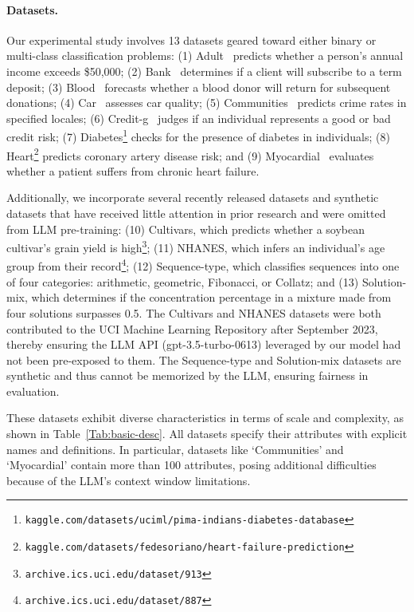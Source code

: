 \paragraph{Datasets.}
Our experimental study involves 13 datasets geared toward either binary or multi-class classification problems: (1) Adult~\cite{asuncion2007uci} predicts whether a person's annual income exceeds \$50,000; (2) Bank~\cite{moro2014data} determines if a client will subscribe to a term deposit; (3) Blood~\cite{yeh2009knowledge} forecasts whether a blood donor will return for subsequent donations; (4) Car~\cite{kadra2021well} assesses car quality; (5) Communities~\cite{misc_communities_and_crime_183} predicts crime rates in specified locales; (6) Credit-g~\cite{kadra2021well} judges if an individual represents a good or bad credit risk; (7) Diabetes\footnote{\texttt{kaggle.com/datasets/uciml/pima-indians-diabetes-database}} checks for the presence of diabetes in individuals; (8) Heart\footnote{\texttt{kaggle.com/datasets/fedesoriano/heart-failure-prediction}} predicts coronary artery disease risk; and (9) Myocardial~\cite{misc_myocardial_infarction_complications_579} evaluates whether a patient suffers from chronic heart failure.

Additionally, we incorporate several recently released datasets and synthetic datasets that have received little attention in prior research and were omitted from LLM pre-training: (10) Cultivars, which predicts whether a soybean cultivar's grain yield is high\footnote{\texttt{archive.ics.uci.edu/dataset/913}}; (11) NHANES, which infers an individual's age group from their record\footnote{\texttt{archive.ics.uci.edu/dataset/887}}; (12) Sequence-type, which classifies sequences into one of four categories: arithmetic, geometric, Fibonacci, or Collatz; and (13) Solution-mix, which determines if the concentration percentage in a mixture made from four solutions surpasses 0.5. The Cultivars and NHANES datasets were both contributed to the UCI Machine Learning Repository after September 2023, thereby ensuring the LLM API (gpt-3.5-turbo-0613) leveraged by our model had not been pre-exposed to them. The Sequence-type and Solution-mix datasets are synthetic and thus cannot be memorized by the LLM, ensuring fairness in evaluation.

These datasets exhibit diverse characteristics in terms of scale and complexity, as shown in Table~\ref{Tab:basic-desc}. All datasets specify their attributes with explicit names and definitions. In particular, datasets like `Communities' and `Myocardial' contain more than 100 attributes, posing additional difficulties because of the LLM's context window limitations.

